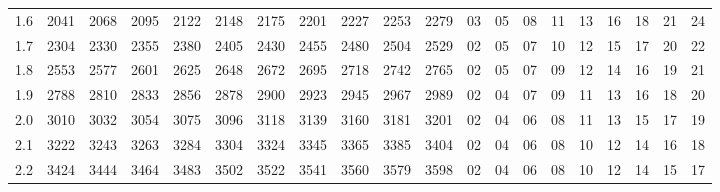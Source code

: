 \documentclass[12pt,UTF8]{ctexbook}
\begin{document}
\begin{appendix}
\begin{longtable}{|c| c c c c c | c c c c c| c c c c c c c c c|}
\scriptsize 1.6 & \scriptsize 2041 & \scriptsize 2068 & \scriptsize 2095 & \scriptsize 2122 & \scriptsize 2148 & \scriptsize 2175 & \scriptsize 2201 & \scriptsize 2227 & \scriptsize 2253 & \scriptsize 2279 & \scriptsize 03 & \scriptsize 05 & \scriptsize 08 & \scriptsize 11 & \scriptsize 13 & \scriptsize 16 & \scriptsize 18 & \scriptsize 21 & \scriptsize 24 \\
\scriptsize 1.7 & \scriptsize 2304 & \scriptsize 2330 & \scriptsize 2355 & \scriptsize 2380 & \scriptsize 2405 & \scriptsize 2430 & \scriptsize 2455 & \scriptsize 2480 & \scriptsize 2504 & \scriptsize 2529 & \scriptsize 02 & \scriptsize 05 & \scriptsize 07 & \scriptsize 10 & \scriptsize 12 & \scriptsize 15 & \scriptsize 17 & \scriptsize 20 & \scriptsize 22 \\
\scriptsize 1.8 & \scriptsize 2553 & \scriptsize 2577 & \scriptsize 2601 & \scriptsize 2625 & \scriptsize 2648 & \scriptsize 2672 & \scriptsize 2695 & \scriptsize 2718 & \scriptsize 2742 & \scriptsize 2765 & \scriptsize 02 & \scriptsize 05 & \scriptsize 07 & \scriptsize 09 & \scriptsize 12 & \scriptsize 14 & \scriptsize 16 & \scriptsize 19 & \scriptsize 21 \\
\scriptsize 1.9 & \scriptsize 2788 & \scriptsize 2810 & \scriptsize 2833 & \scriptsize 2856 & \scriptsize 2878 & \scriptsize 2900 & \scriptsize 2923 & \scriptsize 2945 & \scriptsize 2967 & \scriptsize 2989 & \scriptsize 02 & \scriptsize 04 & \scriptsize 07 & \scriptsize 09 & \scriptsize 11 & \scriptsize 13 & \scriptsize 16 & \scriptsize 18 & \scriptsize 20 \\
\scriptsize 2.0 & \scriptsize 3010 & \scriptsize 3032 & \scriptsize 3054 & \scriptsize 3075 & \scriptsize 3096 & \scriptsize 3118 & \scriptsize 3139 & \scriptsize 3160 & \scriptsize 3181 & \scriptsize 3201 & \scriptsize 02 & \scriptsize 04 & \scriptsize 06 & \scriptsize 08 & \scriptsize 11 & \scriptsize 13 & \scriptsize 15 & \scriptsize 17 & \scriptsize 19 \\
\scriptsize 2.1 & \scriptsize 3222 & \scriptsize 3243 & \scriptsize 3263 & \scriptsize 3284 & \scriptsize 3304 & \scriptsize 3324 & \scriptsize 3345 & \scriptsize 3365 & \scriptsize 3385 & \scriptsize 3404 & \scriptsize 02 & \scriptsize 04 & \scriptsize 06 & \scriptsize 08 & \scriptsize 10 & \scriptsize 12 & \scriptsize 14 & \scriptsize 16 & \scriptsize 18 \\
\scriptsize 2.2 & \scriptsize 3424 & \scriptsize 3444 & \scriptsize 3464 & \scriptsize 3483 & \scriptsize 3502 & \scriptsize 3522 & \scriptsize 3541 & \scriptsize 3560 & \scriptsize 3579 & \scriptsize 3598 & \scriptsize 02 & \scriptsize 04 & \scriptsize 06 & \scriptsize 08 & \scriptsize 10 & \scriptsize 12 & \scriptsize 14 & \scriptsize 15 & \scriptsize 17 \\

\end{longtable}
\end{appendix}
\end{document}
